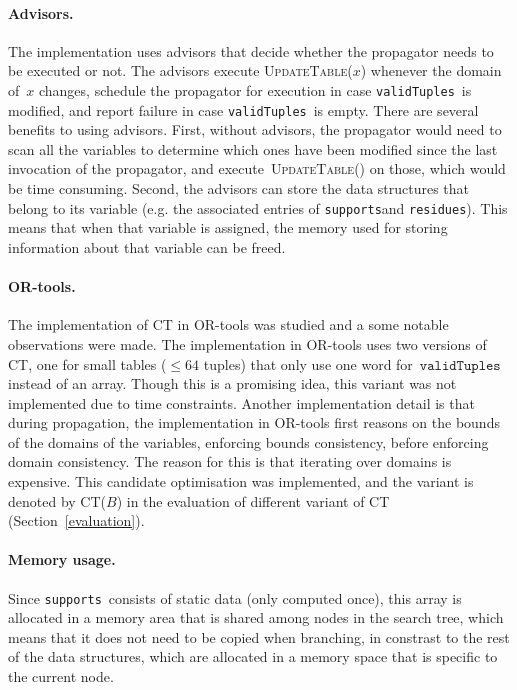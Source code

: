\documentclass[a4paper,11pt]{article}
\newcommand{\Secref}[1]{Section~\ref{#1}}
\newcommand{\CurrTable}{\texttt{validTuples}}
\newcommand{\Supports}{\texttt{supports}}
\newcommand{\Residues}{\texttt{residues}}
\def\UpdateTable{\textsc{UpdateTable}}
\numberwithin{equation}{section}
\begin{document}
\paragraph{Advisors.} The implementation uses advisors that decide whether
the propagator needs to be executed or not. The advisors execute \UpdateTable($x$)
whenever the domain of~$x$ changes, schedule the propagator for execution
in case \CurrTable~is modified, and report failure in case \CurrTable~is empty.
There are several benefits to using advisors. First, without advisors,
the propagator would need
to scan all the variables to determine which ones have been modified since the last
invocation of the propagator, and execute~\UpdateTable() on those,
which would be time consuming.
Second, the advisors can store the data structures that belong to its
variable (e.g. the associated entries of \Supports and \Residues).
This means that when that variable is assigned, the memory used for storing
information about that variable can be freed.

\paragraph{OR-tools.} The implementation of CT in OR-tools was studied and
a some notable observations were made.
The implementation in OR-tools uses two versions of CT, one for small tables 
($\leq 64$ tuples) that only use one word for~$\CurrTable$ instead of an array.
Though this is a
promising idea, this variant was not implemented due to time constraints.
Another implementation detail is that during propagation, the implementation
in OR-tools first reasons on the bounds of the domains of the variables,
enforcing bounds consistency,
before enforcing domain consistency. The reason for this is that
iterating over domains is
expensive. This candidate optimisation was implemented, 
and the variant is denoted by CT($B$) in the
evaluation of different variant of CT (\Secref{evaluation}).

\paragraph{Memory usage.} Since \Supports~consists of static data (only
computed once), this array is allocated in a memory area that is shared
among nodes in the search tree, which means that it does not need to be
copied when branching, in constrast to the rest of the data structures,
which are allocated in a memory space that is specific to the current node.
\end{document}
